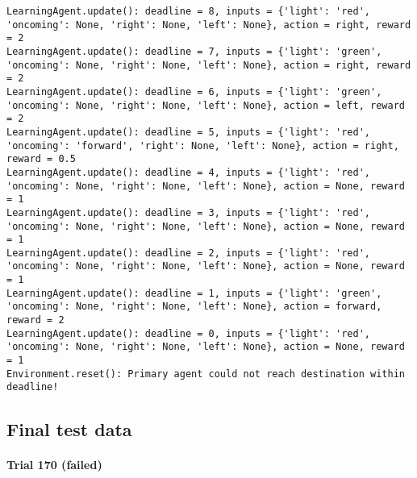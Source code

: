 \documentclass{article}
\begin{document}
\begin{verbatim}
LearningAgent.update(): deadline = 8, inputs = {'light': 'red', 'oncoming': None, 'right': None, 'left': None}, action = right, reward = 2
LearningAgent.update(): deadline = 7, inputs = {'light': 'green', 'oncoming': None, 'right': None, 'left': None}, action = right, reward = 2
LearningAgent.update(): deadline = 6, inputs = {'light': 'green', 'oncoming': None, 'right': None, 'left': None}, action = left, reward = 2
LearningAgent.update(): deadline = 5, inputs = {'light': 'red', 'oncoming': 'forward', 'right': None, 'left': None}, action = right, reward = 0.5
LearningAgent.update(): deadline = 4, inputs = {'light': 'red', 'oncoming': None, 'right': None, 'left': None}, action = None, reward = 1
LearningAgent.update(): deadline = 3, inputs = {'light': 'red', 'oncoming': None, 'right': None, 'left': None}, action = None, reward = 1
LearningAgent.update(): deadline = 2, inputs = {'light': 'red', 'oncoming': None, 'right': None, 'left': None}, action = None, reward = 1
LearningAgent.update(): deadline = 1, inputs = {'light': 'green', 'oncoming': None, 'right': None, 'left': None}, action = forward, reward = 2
LearningAgent.update(): deadline = 0, inputs = {'light': 'red', 'oncoming': None, 'right': None, 'left': None}, action = None, reward = 1
Environment.reset(): Primary agent could not reach destination within deadline!
\end{verbatim}

    \subsection{Final test data}\label{final-test-data}

\paragraph{Trial 170 (failed)}\label{trial-170-failed}
\end{document}
